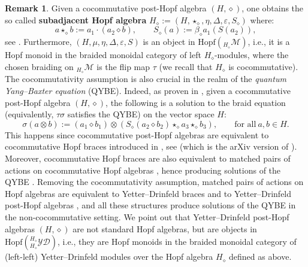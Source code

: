 \documentclass[10pt]{article}
\theoremstyle{definition}
\newtheorem{remark}[lemma]{Remark}
\renewcommand{\wp}{\diamond}
\newcommand{\ot}{\otimes}
\begin{document}
\begin{remark}\label{rmk:subadj}
Given a cocommutative post-Hopf algebra $(H,\wp)$, one obtains the so called \textbf{subadjacent Hopf algebra} $H_{\wp}:=(H,\star_{\wp},\eta,\Delta,\varepsilon,S_{\wp})$ where:
\[
a\star_{\wp} b:=a_{1}\cdot(a_{2}\wp b),\qquad S_{\wp}(a):=\beta_{\wp}a_{1}(S(a_{2})),
\]
see \cite[Theorem 2.5]{LST}. Furthermore, $(H,\mu,\eta,\Delta,\varepsilon,S)$ is an object in $\mathrm{Hopf}(_{H_{\wp}}\mathcal{M})$, i.e., it is a Hopf monoid in the braided monoidal category of left $H_{\wp}$-modules, where the chosen braiding on $_{H_{\wp}}\mathcal{M}$ is the flip map $\tau$ (we recall that $H_{\wp}$ is cocommutative). The cocommutativity assumption is also crucial in the realm of the \textit{quantum Yang--Baxter equation} (QYBE). Indeed, as proven in \cite[Theorem 4.8]{LST}, given a cocommutative post-Hopf algebra $(H,\wp)$, the following is a solution to the braid equation (equivalently, $\tau\sigma$ satisfies the QYBE) on the vector space $H$:
\begin{equation}
\sigma(a\ot b):=(a_{1}\wp b_{1})\ot(S_{\wp}(a_{2}\wp b_{2})\star_{\wp}a_{3}\star_{\wp}b_{3}),\qquad \text{for all}\ a,b\in H.
\end{equation}
This happens since cocommutative post-Hopf algebras are equivalent to cocommutative Hopf braces introduced in \cite{AGV}, see \cite[Theorem 2.13]{LSTarXiv} (which is the arXiv version of \cite{LST}). Moreover, cocommutative Hopf braces are also equivalent to matched pairs of actions on cocommutative Hopf algebras \cite[Theorem 3.3]{AGV}, hence producing solutions of the QYBE \cite[Corollary 2.4]{AGV}. Removing the cocommutativity assumption, matched pairs of actions on Hopf algebras are equivalent to Yetter--Drinfeld braces \cite{FeSc} and to Yetter--Drinfeld post-Hopf algebras \cite{Sciandra}, and all these structures produce solutions of the QYBE in the non-cocommutative setting. We point out that Yetter--Drinfeld post-Hopf algebras $(H,\wp)$ are not standard Hopf algebras, but are objects in $\mathrm{Hopf}(^{H_{\wp}}_{H_{\wp}}\mathcal{YD})$, i.e., they are Hopf monoids in the braided monoidal category of (left-left) Yetter--Drinfeld modules over the Hopf algebra $H_{\wp}$ defined as above.
\end{remark}
\end{document}
